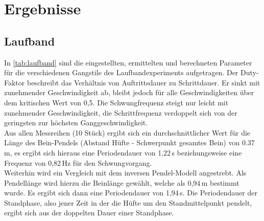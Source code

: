 \section{Ergebnisse}
\subsection{Laufband}
In \autoref{tab:laufband} sind die eingestellten, ermittelten und berechneten Parameter für die verschiedenen Gangstile des Laufbandexperiments aufgetragen. Der Duty-Faktor beschreibt das Verhältnis von Auftrittsdauer zu Schrittdauer. Er sinkt mit zunehmender Geschwindigkeit ab, bleibt jedoch für alle Geschwindigkeiten über dem kritischen Wert von 0,5. Die Schwungfrequenz steigt nur leicht mit zunehmender Geschwindigkeit, die Schrittfrequenz verdoppelt sich von der geringsten zur höchsten Ganggeschwindigkeit. \\
Aus allen Messreihen (10 Stück) ergibt sich ein durchschnittlicher Wert für die Länge des Bein-Pendels (Abstand Hüfte - Schwerpunkt gesamtes Bein) von 0.37\,m, es ergibt sich hieraus eine Periodendauer von 1,22\,s beziehungsweise eine Frequenz von 0,82\,Hz für den Schwungvorgang. \\
Weiterhin wird ein Vergleich mit dem inversen Pendel-Modell angestrebt. Als Pendellänge wird hierzu die Beinlänge gewählt, welche als 0,94\,m bestimmt wurde. Es ergibt sich dann eine Periodendauer von 1,94\,s. Die Periodendauer der Standphase, also jener Zeit in der die Hüfte um den Standmittelpunkt pendelt, ergibt sich aus der doppelten Dauer einer Standphase. \\

